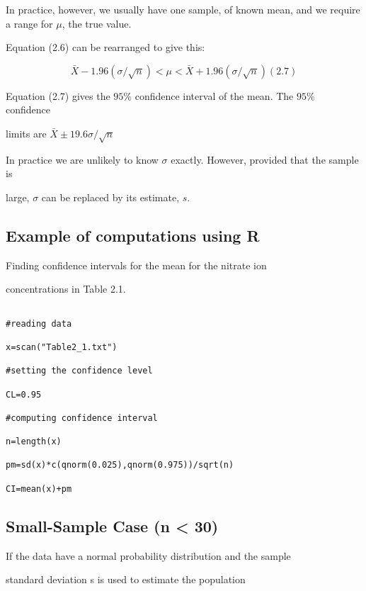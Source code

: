  

In practice, however, we usually have one sample, of known mean, and we require a range for $\mu$, the true value.

 

Equation (2.6) can be rearranged to give this:

\[ \bar{X} - 1.96(\sigma/\sqrt{n}) < \mu < \bar{X} + 1.96(\sigma/\sqrt{n}) (2.7)\]

 

Equation (2.7) gives the $95\%$  confidence interval of the mean. The $95\%$  confidence

limits are $\bar{X} \pm 19.6 \sigma/\sqrt{n}$

In practice we are unlikely to know $\sigma$ exactly. However, provided that the sample is

large, $\sigma$ can be replaced by its estimate, $s$.

 



\subsection{Example of computations using R}

Finding confidence intervals for the mean for the nitrate ion

concentrations in Table 2.1.

\begin{verbatim}

#reading data

x=scan("Table2_1.txt")

#setting the confidence level

CL=0.95

#computing confidence interval

n=length(x)

pm=sd(x)*c(qnorm(0.025),qnorm(0.975))/sqrt(n)

CI=mean(x)+pm

\end{verbatim}

 

\subsection{Small-Sample Case (n < 30)}

If the data have a normal probability distribution and the sample

standard deviation s is used to estimate the population


